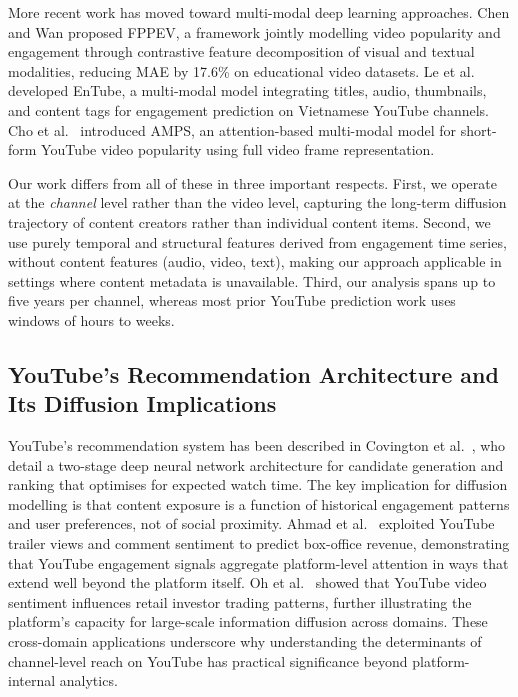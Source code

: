\documentclass[journal,article,submit,pdftex,moreauthors]{Definitions/mdpi}
\begin{document}
More recent work has moved toward multi-modal deep learning approaches.
Chen and Wan \cite{ref-chenwan2026} proposed FPPEV, a framework jointly
modelling video popularity and engagement through contrastive feature
decomposition of visual and textual modalities, reducing MAE by 17.6\%
on educational video datasets.
Le et al.\ \cite{ref-le2025} developed EnTube, a multi-modal model
integrating titles, audio, thumbnails, and content tags for engagement
prediction on Vietnamese YouTube channels.
Cho et al.\ \cite{ref-cho2024} introduced AMPS, an attention-based
multi-modal model for short-form YouTube video popularity using full video
frame representation.

Our work differs from all of these in three important respects.
First, we operate at the \emph{channel} level rather than the video level,
capturing the long-term diffusion trajectory of content creators rather
than individual content items.
Second, we use purely temporal and structural features derived from
engagement time series, without content features (audio, video, text),
making our approach applicable in settings where content metadata is
unavailable.
Third, our analysis spans up to five years per channel, whereas most
prior YouTube prediction work uses windows of hours to weeks.

\subsection{YouTube's Recommendation Architecture and Its Diffusion Implications}

YouTube's recommendation system has been described in Covington et al.\
\cite{ref-covington2016}, who detail a two-stage deep neural network
architecture for candidate generation and ranking that optimises for
expected watch time.
The key implication for diffusion modelling is that content exposure
is a function of historical engagement patterns and user preferences,
not of social proximity.
Ahmad et al.\ \cite{ref-ahmad2020} exploited YouTube trailer views and
comment sentiment to predict box-office revenue, demonstrating that
YouTube engagement signals aggregate platform-level attention in ways
that extend well beyond the platform itself.
Oh et al.\ \cite{ref-oh2026} showed that YouTube video sentiment
influences retail investor trading patterns, further illustrating the
platform's capacity for large-scale information diffusion across domains.
These cross-domain applications underscore why understanding the
determinants of channel-level reach on YouTube has practical significance
beyond platform-internal analytics.
\end{document}
